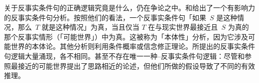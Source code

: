 \documentclass[../../../include/open-logic-section]{subfiles}
\begin{document}
关于反事实条件句的正确逻辑究竟是什么，仍在争论之中。和给出了一个有影响力的反事实条件句分析。按照他们的看法，一个反事实条件句「如果~$S$ 是这种情况，那么~$T$ 就是这种情况」为真，当且仅当 $T$ 在与现实世界最接近且~$S$ 为真的那个反事实情形（「可能世界」）中为真。这被称为「本体性」分析，因为它涉及可能世界的本体论。其他分析则利用条件概率或信念修正理论。所提出的反事实条件句逻辑大量涌现，各不相同。甚至不存在唯一一种--反事实条件句逻辑：尽管和参照最接近的可能世界提出了思路相近的论述，但他们所做的假设导致了不同的有效推理。
\end{document}
